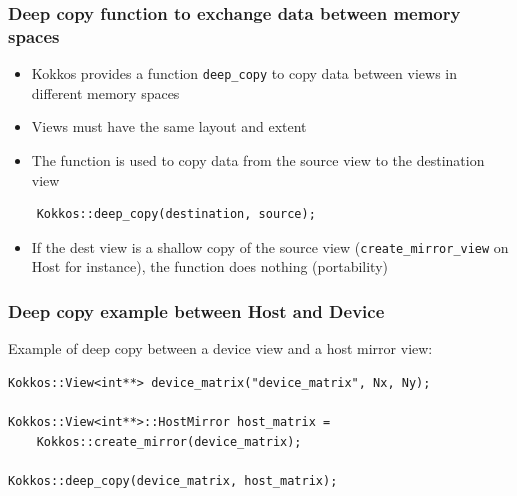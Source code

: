 \documentclass[aspectratio=169]{beamer}
\begin{document}

\begin{frame}[fragile]
    \frametitle{Deep copy function to exchange data between memory spaces}

\begin{itemize}
    \item Kokkos provides a function \texttt{deep\_copy} to copy data between views in different memory spaces
    \item Views must have the same layout and extent
    \item The function is used to copy data from the source view to the destination view
\end{itemize}

\begin{verbatim}
    Kokkos::deep_copy(destination, source);
\end{verbatim}

\begin{itemize}
    \item If the dest view is a shallow copy of the source view (\texttt{create\_mirror\_view} on Host for instance), the function does nothing (portability)
\end{itemize}
\end{frame}


\begin{frame}[fragile]
    \frametitle{Deep copy example between Host and Device}

Example of deep copy between a device view and a host mirror view:

\begin{verbatim}
Kokkos::View<int**> device_matrix("device_matrix", Nx, Ny);

Kokkos::View<int**>::HostMirror host_matrix = 
    Kokkos::create_mirror(device_matrix);

Kokkos::deep_copy(device_matrix, host_matrix);
\end{verbatim}
\end{frame}

\end{document}
